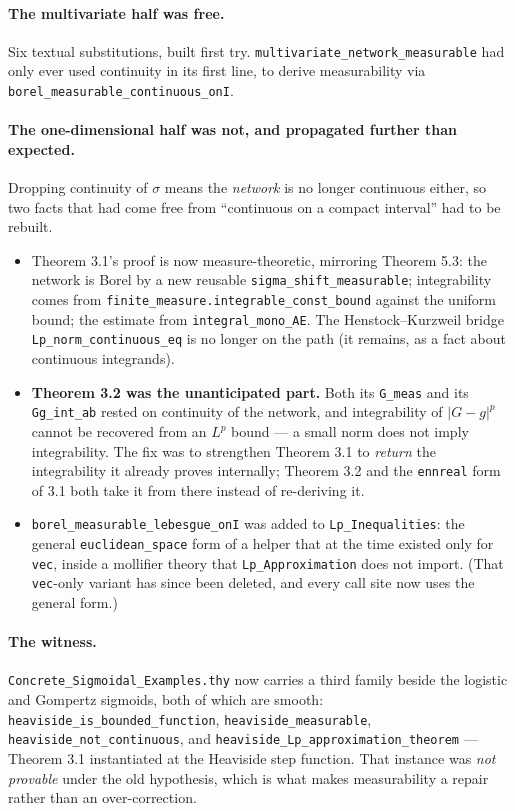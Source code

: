 \documentclass[11pt,a4paper]{article}
\newcommand{\Lp}{L^{p}}
\newcommand{\isa}[1]{\texttt{#1}}
\begin{document}
\paragraph{The multivariate half was free.} Six textual substitutions, built first try.
\isa{multivariate\_network\_measurable} had only ever used continuity in its first line, to
derive measurability via \isa{borel\_measurable\_continuous\_onI}.

\paragraph{The one-dimensional half was not, and propagated further than expected.} Dropping
continuity of $\sigma$ means the \emph{network} is no longer continuous either, so two facts
that had come free from ``continuous on a compact interval'' had to be rebuilt.

\begin{itemize}
\item Theorem 3.1's proof is now measure-theoretic, mirroring Theorem 5.3: the network is Borel
  by a new reusable \isa{sigma\_shift\_measurable}; integrability comes from
  \isa{finite\_measure.integrable\_const\_bound} against the uniform bound; the estimate from
  \isa{integral\_mono\_AE}. The Henstock--Kurzweil bridge \isa{Lp\_norm\_continuous\_eq} is no
  longer on the path (it remains, as a fact about continuous integrands).
\item \textbf{Theorem 3.2 was the unanticipated part.} Both its \isa{G\_meas} and its
  \isa{Gg\_int\_ab} rested on continuity of the network, and integrability of $|G-g|^p$ cannot
  be recovered from an $\Lp$ bound --- a small norm does not imply integrability. The fix was
  to strengthen Theorem 3.1 to \emph{return} the integrability it already proves internally;
  Theorem 3.2 and the \isa{ennreal} form of 3.1 both take it from there instead of re-deriving
  it.
\item \isa{borel\_measurable\_lebesgue\_onI} was added to \isa{Lp\_Inequalities}: the general
  \isa{euclidean\_space} form of a helper that at the time existed only for \isa{vec}, inside a
  mollifier theory that \isa{Lp\_Approximation} does not import. (That \isa{vec}-only variant
  has since been deleted, and every call site now uses the general form.)
\end{itemize}

\paragraph{The witness.} \isa{Concrete\_Sigmoidal\_Examples.thy} now carries a third family
beside the logistic and Gompertz sigmoids, both of which are smooth:
\isa{heaviside\_is\_bounded\_function}, \isa{heaviside\_measurable},
\isa{heaviside\_not\_continuous}, and \isa{heaviside\_Lp\_approximation\_theorem} --- Theorem
3.1 instantiated at the Heaviside step function. That instance was \emph{not provable} under
the old hypothesis, which is what makes measurability a repair rather than an over-correction.
\end{document}
